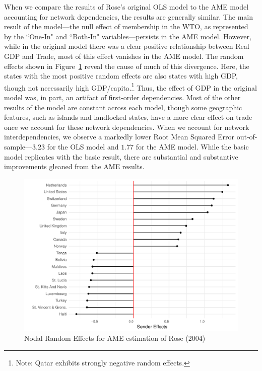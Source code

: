 When we compare the results of Rose's original OLS model to the AME model accounting for network dependencies, the results are generally similar. The main result of the model---the null effect of membership in the WTO, as represented by the ``One-In" and ``Both-In" variables---persists in the AME model. However, while in the original model there was a clear positive relationship between Real GDP and Trade, most of this effect vanishes in the AME model. The random effects shown in Figure~\ref{fig:roser} reveal the cause of much of this divergence. Here, the states with the most positive random effects are also states with high GDP, though not necessarily high GDP/capita.\footnote{Note: Qatar exhibits strongly negative random effects.} Thus, the effect of GDP in the original model was, in part, an artifact of first-order dependencies. Most of the other results of the model are constant across each model, though some geographic features, such as islands and landlocked states, have a more clear effect on trade once we account for these network dependencies. When we account for network interdependencies, we observe a markedly lower Root Mean Squared Error out-of-sample---$3.23$ for the OLS model and $1.77$ for the AME model. While the basic model replicates with the basic result, there are substantial and substantive improvements gleaned from the AME results.

\begin{figure}
\includegraphics[width=\textwidth]{rose_aeff_top10.pdf}
 \caption{Nodal Random Effects for AME estimation of Rose (2004)}\label{fig:roser}
\end{figure}
\FloatBarrier

